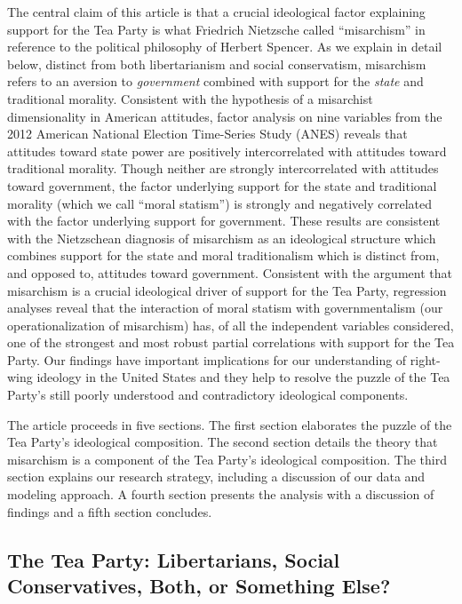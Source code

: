 \documentclass[12pt,]{article}
\begin{document}
The central claim of this article is that a crucial ideological factor
explaining support for the Tea Party is what Friedrich Nietzsche called
``misarchism'' in reference to the political philosophy of Herbert
Spencer. As we explain in detail below, distinct from both
libertarianism and social conservatism, misarchism refers to an aversion
to \emph{government} combined with support for the \emph{state} and
traditional morality. Consistent with the hypothesis of a misarchist
dimensionality in American attitudes, factor analysis on nine variables
from the 2012 American National Election Time-Series Study (ANES)
reveals that attitudes toward state power are positively intercorrelated
with attitudes toward traditional morality. Though neither are strongly
intercorrelated with attitudes toward government, the factor underlying
support for the state and traditional morality (which we call ``moral
statism'') is strongly and negatively correlated with the factor
underlying support for government. These results are consistent with the
Nietzschean diagnosis of misarchism as an ideological structure which
combines support for the state and moral traditionalism which is
distinct from, and opposed to, attitudes toward government. Consistent
with the argument that misarchism is a crucial ideological driver of
support for the Tea Party, regression analyses reveal that the
interaction of moral statism with governmentalism (our
operationalization of misarchism) has, of all the independent variables
considered, one of the strongest and most robust partial correlations
with support for the Tea Party. Our findings have important implications
for our understanding of right-wing ideology in the United States and
they help to resolve the puzzle of the Tea Party's still poorly
understood and contradictory ideological components.

The article proceeds in five sections. The first section elaborates the
puzzle of the Tea Party's ideological composition. The second section
details the theory that misarchism is a component of the Tea Party's
ideological composition. The third section explains our research
strategy, including a discussion of our data and modeling approach. A
fourth section presents the analysis with a discussion of findings and a
fifth section concludes.

\subsection{The Tea Party: Libertarians, Social Conservatives, Both, or
Something
Else?}\label{the-tea-party-libertarians-social-conservatives-both-or-something-else}
\end{document}
